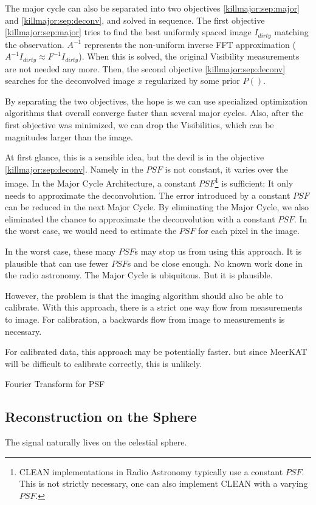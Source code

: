 The major cycle can also be separated into two objectives \eqref{killmajor:sep:major} and \eqref{killmajor:sep:deconv}, and solved in sequence. The first objective \eqref{killmajor:sep:major} tries to find the best uniformly spaced image $I_{dirty}$ matching the observation. $A^{-1}$ represents the non-uniform inverse FFT approximation ($A^{-1}I_{dirty} \approx F^{-1}I_{dirty}$). When this is solved, the original Visibility measurements are not needed any more. Then, the second objective \eqref{killmajor:sep:deconv} searches for the deconvolved image $x$ regularized by some prior $P()$.

By separating the two objectives, the hope is we can use specialized optimization algorithms that overall converge faster than several major cycles. Also, after the first objective was minimized, we can drop the Visibilities, which can be magnitudes larger than the image. 

At first glance, this is a sensible idea, but the devil is in the objective \eqref{killmajor:sep:deconv}. Namely in the $PSF$ is not constant, it varies over the image. In the Major Cycle Architecture, a constant $PSF$\footnote{CLEAN implementations in Radio Astronomy typically use a constant $PSF$. This is not strictly necessary, one can also implement CLEAN with a varying $PSF$.} is sufficient: It only needs to approximate the deconvolution. The error introduced by a constant $PSF$ can be reduced in the next Major Cycle. By eliminating the Major Cycle, we also eliminated the chance to approximate the deconvolution with a constant $PSF$. In the worst case, we would need to estimate the $PSF$ for each pixel in the image.

In the worst case, these many $PSF$s may stop us from using this approach. It is plausible that can use fewer $PSF$s and be close enough. No known work done in the radio astronomy. The Major Cycle is ubiquitous. But it is plausible.

However, the problem is that the imaging algorithm should also be able to calibrate. With this approach, there is a strict one way flow from measurements to image. For calibration, a backwards flow from image to measurements is necessary.

For calibrated data, this approach may be potentially faster. but since MeerKAT will be difficult to calibrate correctly, this is unlikely.

Fourier Transform for PSF

\subsection{Reconstruction on the Sphere}
The signal naturally lives on the celestial sphere.

